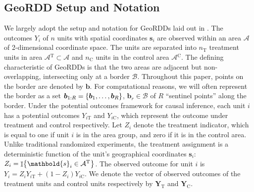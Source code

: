 \documentclass[letter]{article}
\DeclarePairedDelimiter{\curlybracket}{\lbrace}{\rbrace}
\newcommand{\cbr}[1]{\curlybracket*{#1}}
\DeclareMathOperator{\Ind}{\mathbb{I}}
\newcommand{\area}{\mathcal{A}}
\newcommand{\treat}{\mathrm{T}}
\newcommand{\ctrol}{\mathrm{C}}
\newcommand{\treatind}{Z}
\newcommand{\treatarea}{\area{}^{\treat}}
\newcommand{\ctrolarea}{\area{}^{\ctrol}}
\newcommand{\svec}{\mathbold{s}}
\newcommand{\Yvec}{\mathbold{Y}}
\newcommand{\yt}{\Yvec_{\treat}}
\newcommand{\yc}{\Yvec_{\ctrol}}
\newcommand{\border}{\mathcal{B}}
\newcommand{\sentinel}{\bm{b}}
\newcommand{\numsent}{R}
\newcommand{\sentinels}{\sentinel_{1:\numsent}}
\newcommand{\isent}{r}
\newcommand{\sentinelset}{\cbr{\sentinel_1,\ldots,\sentinel_\numsent}}
\renewcommand{\cite}[1]{\citet{#1}}
\begin{document}
\label{sec:geordd_model}

\hypertarget{geordd-setup-and-notation}{%
\subsection{GeoRDD Setup and Notation}\label{geordd-setup-and-notation}}

We largely adopt the setup and notation for GeoRDDs laid out in \cite{keele_titiunik_2015}.
The outcomes \(Y_i\) of \(n\) units with spatial coordinates \(\svec_i\) are observed within an area \(\area\) of 2-dimensional coordinate space.
The units are separated into \(n_\treat\) treatment units in area \(\treatarea \subset \area\)
and \(n_\ctrol\) units in the control area \(\ctrolarea\).
The defining characteristic of GeoRDDs is that the two areas are adjacent but non-overlapping, intersecting only at a border \(\border\).
Throughout this paper, points on the border are denoted by \(\sentinel\).
For computational reasons, we will often represent the border as a set \(\sentinels=\sentinelset\), \(\sentinel_\isent \in \border\) of \(\numsent\) ``sentinel points'' along the border.
Under the potential outcomes framework for causal inference, each unit \(i\) has a potential outcomes \(Y_{i\treat}\) and \(Y_{i\ctrol}\), which represent the outcome under treatment and control respectively.
Let \(\treatind_i\) denote the treatment indicator, which is equal to one if unit \(i\) is in the area group, and zero if it is in the control area.
Unlike traditional randomized experiments, the treatment assignment is a deterministic function of the unit's geographical coordinates \(\svec_i\): \(\treatind_i = \Ind\cbr{\svec_i \in \treatarea}\).
The observed outcome for unit \(i\) is \(Y_i = \treatind_i Y_{i\treat} + (1 - \treatind_i) Y_{i\ctrol}\).
We denote the vector of observed outcomes of the treatment units and control units respectively by \(\yt\) and \(\yc\).
    
\end{document}
